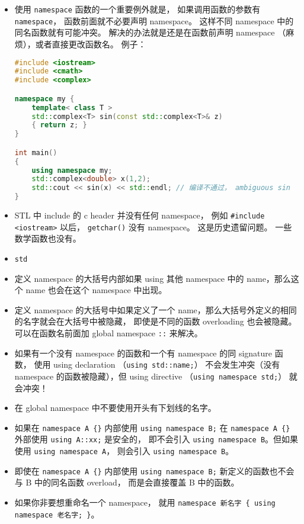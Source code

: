 
\begin{issues}
\issueDraft
\end{issues}

\begin{itemize}
\item 使用 \verb|namespace| 函数的一个重要例外就是， 如果调用函数的参数有 \verb|namespace|， 函数前面就不必要声明 namespace。 这样不同 namespace 中的同名函数就有可能冲突。 解决的办法就是还是在函数前声明 namespace （麻烦），或者直接更改函数名。 例子：
\begin{lstlisting}[language=cpp]
#include <iostream>
#include <cmath>
#include <complex>

namespace my {
	template< class T >
	std::complex<T> sin(const std::complex<T>& z)
	{ return z; }
}

int main()
{
	using namespace my;
	std::complex<double> x(1,2);
	std::cout << sin(x) << std::endl; // 编译不通过， ambiguous sin
}
\end{lstlisting}
\item STL 中 include 的 c header 并没有任何 namespace， 例如 \verb|#include <iostream>| 以后， \verb|getchar()| 没有 namespace。 这是历史遗留问题。 一些数学函数也没有。
\item \verb`std`
\item 定义 namespace 的大括号内部如果 using 其他 namespace 中的 name，那么这个 name 也会在这个 namespace 中出现。
\item 定义 namespace 的大括号中如果定义了一个 name，那么大括号外定义的相同的名字就会在大括号中被隐藏， 即使是不同的函数 overloading 也会被隐藏。 可以在函数名前面加 global namespace \verb|::| 来解决。
\item 如果有一个没有 namespace 的函数和一个有 namespace 的同 signature 函数， 使用 using declaration （\verb|using std::name;|） 不会发生冲突（没有 namespace 的函数被隐藏），但 using directive （\verb|using namespace std;|） 就会冲突！
\item 在 global namespace 中不要使用开头有下划线的名字。
\item 如果在 \verb|namespace A {}| 内部使用 \verb|using namespace B;| 在 \verb|namespace A {}| 外部使用 \verb|using A::xx;| 是安全的， 即不会引入 \verb|using namespace B|。但如果使用 \verb|using namespace A|， 则会引入 \verb|using namespace B|。
\item 即使在 \verb|namespace A {}| 内部使用 \verb|using namespace B;|  新定义的函数也不会与 B 中的同名函数 overload， 而是会直接覆盖 B 中的函数。
\item 如果你非要想重命名一个 namespace， 就用 \verb|namespace 新名字 { using namespace 老名字; }|。
\end{itemize}
